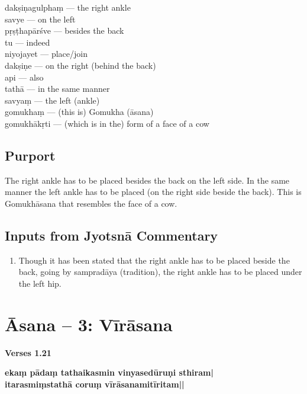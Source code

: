 \begin{multicols}{2}
dakṣiṇagulphaṃ --- the right ankle\\ 
savye --- on the left\\ 
pṛṣṭhapārśve --- besides the back\\ 
tu --- indeed\\ 
niyojayet --- place/join\\ 
dakṣiṇe --- on the right (behind the back)\\ 
api --- also\\
tathā --- in the same manner\\
savyaṃ --- the left (ankle)\\
gomukhaṃ --- (this is) Gomukha (āsana)\\
gomukhākṛti --- (which is in the) form of a face of a cow\\
\end{multicols}

\subsection*{Purport}

The right ankle has to be placed besides the back on the left side. In the same manner the left ankle has to be placed (on the right side beside the back). This is Gomukhāsana that resembles the face of a cow.

\subsection*{Inputs from Jyotsnā Commentary}

\begin{enumerate}
\item Though it has been stated that the right ankle has to be placed beside the back, going by sampradāya (tradition), the right ankle has to be placed under the left hip.
\end{enumerate}
\newpage

\section*{Āsana -- 3: Vīrāsana}

\noindent \textbf{Verses 1.21}

\begin{shloka}
\textbf{ekaṃ pādaṃ tathaikasmin vinyasedūruṇi sthiram|}\\
\textbf{itarasmiṃstathā coruṃ vīrāsanamitīritam||}
\end{shloka}

